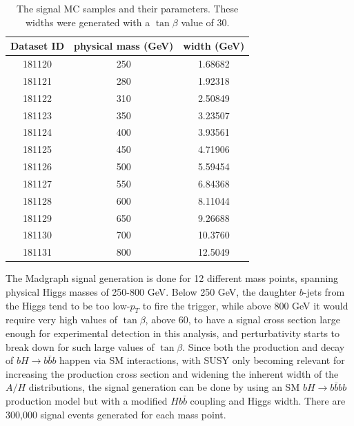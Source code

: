 


\begin{table}
   \caption{The signal MC samples and their parameters. These widths were generated with a $\tan\beta$ value of 30.\label{tab:sig_mc_parameters} }
    \center
    \begin{tabular}{ c c c } \hline\hline
    Dataset ID & physical mass (GeV) & width (GeV) \\ \hline
    181120     & 250        & 1.68682 \\
    181121     & 280        & 1.92318 \\
    181122     & 310        & 2.50849 \\
    181123     & 350        & 3.23507 \\
    181124     & 400        & 3.93561 \\
    181125     & 450        & 4.71906 \\
    181126     & 500        & 5.59454 \\
    181127     & 550        & 6.84368 \\
    181128     & 600        & 8.11044 \\
    181129     & 650        & 9.26688 \\
    181130     & 700        & 10.3760 \\
    181131     & 800        & 12.5049 \\ \hline
    \end{tabular}
\end{table}





The Madgraph signal generation is done for 12 different mass points, spanning physical
Higgs masses of 250-800 GeV. 
Below 250 GeV, the daughter $b$-jets from the Higgs tend to be 
too low-$p_T$ to fire the trigger, while above 800 GeV it would require very 
high values of $\tan\beta$, above 60, to have a signal cross section large enough
for experimental detection in this analysis, and perturbativity starts to break
down for such large values of $\tan\beta$.
Since both the production and decay of $bH\rightarrow b\bar{b}b$ 
happen via SM interactions, with SUSY only becoming relevant for increasing the production cross section and 
widening the inherent width of the $A/H$ distributions, the signal generation can 
be done by using an SM $bH\rightarrow b\bar{b}bb$ production model but with a 
modified $Hb\bar{b}$ coupling and Higgs width.  There are 300,000 signal events generated for each mass point.

